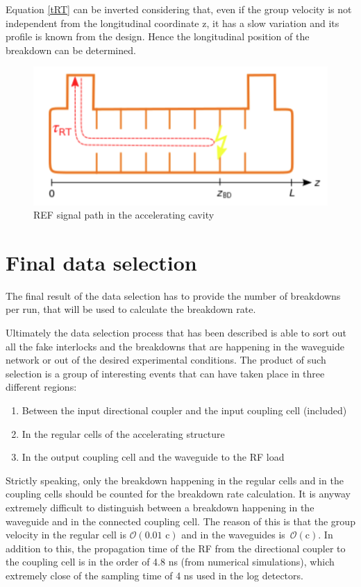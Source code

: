 Equation \ref{tRT} can be inverted considering that, even if the group velocity is not independent from the longitudinal coordinate z, it has a slow variation and its profile is known from the design. Hence the longitudinal position of the breakdown can be determined. 


\begin{figure}[h]
\centering 
\includegraphics[scale=0.3]{pictures/tToz}
\caption{REF signal path in the accelerating cavity}
\label{tToz_p}
\end{figure}




\section[Final data selection]{Final data selection}

The final result of the data selection has to provide the number of breakdowns per run, that will be used to calculate the breakdown rate. 

Ultimately the data selection process that has been described is able to sort out all the fake interlocks and the breakdowns that are happening in the waveguide network or out of the desired experimental conditions. The product of such selection is a group of interesting events that can have taken place in three different regions:
\begin{enumerate}
\item Between the input directional coupler and the input coupling cell (included)
\item In the regular cells of the accelerating structure
\item In the output coupling cell and the waveguide to the RF load
\end{enumerate}
Strictly speaking, only the breakdown happening in the regular cells and in the coupling cells should be counted for the breakdown rate calculation. It is anyway extremely difficult to distinguish between a breakdown happening in the waveguide and in the connected coupling cell. The reason of this is that the group velocity in the regular cell is $\mathcal{O}(\text{0.01 c})$ and in the waveguides is~$\mathcal{O}(\text{c})$. In addition to this, the propagation time of the RF from the directional coupler to the coupling cell is in the order of 4.8 ns (from numerical simulations), which extremely close of the sampling time of 4 ns used in the log detectors. 

